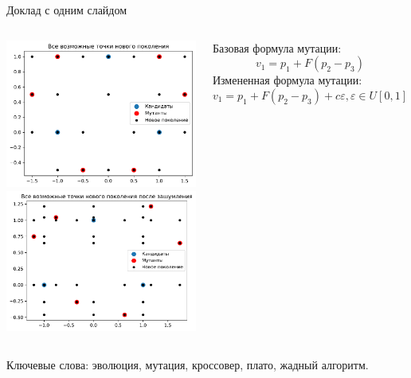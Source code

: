 \documentclass{beamer}
\begin{document}
\begin{frame}{Доклад с одним слайдом}

\begin{columns}[c]
\includegraphics[width=1\textwidth]{V.pdf}
\includegraphics[width=1\textwidth]{V_noisy.pdf}

Базовая формула мутации:
    $$v_1 = p_1 + F(p_2 - p_3)$$
Измененная формула мутации:
    $$v_1 = p_1 + F(p_2 - p_3) + c\varepsilon, \varepsilon \in U[0, 1]$$
\end{columns}

\bigskip
Ключевые слова: {\color{red}эволюция, мутация, кроссовер, плато, жадный алгоритм}.
\end{frame}

\end{document}
